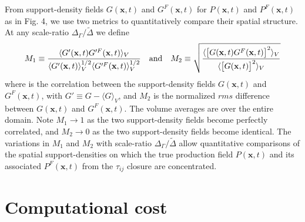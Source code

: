 From support-density fields   $G(\mathbf{x},t)$  and  $G^{F}(\mathbf{x},t)$   for   $P(\mathbf{x},t)$  and  $P^{F}(\mathbf{x},t)$    as in Fig. 4, we use two metrics to quantitatively compare their spatial structure. At any scale-ratio  $\Delta_{\Gamma}/\widetilde{\Delta}$ we define
%
\begin{equation}
	\label{E:11}
	M_1 \equiv \frac{\langle G'(\mathbf{x},t) G'^{F}(\mathbf{x},t)  \rangle_{V}}
	{\langle G'(\mathbf{x},t) \rangle_{V}^{1/2}  
	 \langle G'^{F}(\mathbf{x},t) \rangle_{V}^{1/2}} 
	\quad \textnormal{and} \quad
	 M_2 \equiv \sqrt{\frac{\langle \big[ G(\mathbf{x},t) G^{F}(\mathbf{x},t) \big]^{2} \rangle_{V}}
	{\langle \big[ G(\mathbf{x},t) \big]^2 \rangle_{V}}}
\end{equation}
%
%                
where   is the correlation between the support-density fields $G(\mathbf{x},t)$  and  $G^{F}(\mathbf{x},t)$, with $G' \equiv G - \langle G \rangle_V$, and $M_2$  is the normalized $rms$ difference between  $G(\mathbf{x},t)$  and  $G^{F}(\mathbf{x},t)$. The volume averages are over the entire domain. Note $M_1 \rightarrow 1$  as the two support-density fields become perfectly correlated, and  $M_2 \rightarrow 0$  as the two support-density fields become identical. The variations in  $M_1$ and $M_2$  with scale-ratio $\Delta_{\Gamma}/\widetilde{\Delta}$  allow quantitative comparisons of the spatial support-densities on which the true production field  $P(\mathbf{x},t)$  and its associated $P^{F}(\mathbf{x},t)$ from the $\tau_{ij}$  closure are concentrated. 

\section{Computational cost}

